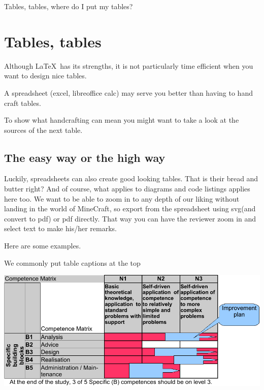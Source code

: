 \begin{savequote}[15cm]
  \vspace{-30mm}
  \raggedleft
  \sffamily
  Tables, tables, where do I put my tables?
\end{savequote}
\chapter{Tables, tables}

Although \LaTeX\ has its strengths, it is not particularly time efficient when you want to design nice tables.

A spreadsheet (excel, libreoffice calc) may serve you better than having to hand craft tables.

To show what handcrafting can mean you might want to take a look at the sources of the next table.



\section{The easy way or the high way}

Luckily, spreadsheets can also create good looking tables. That is their bread and butter right?
And of course, what applies to diagrams and code listings applies here too. We want to be able to zoom in to any depth
of our liking without landing in the world of MineCraft, so export from the spreadsheet using svg(and convert to pdf) or pdf directly. That way you can have the reviewer zoom in and select text to make his/her remarks.

Here are some examples.

\begin{table}
  \caption{We commonly put table captions at the top}
\includegraphics{tables/matrixExample-crop.pdf}   
\end{table}

